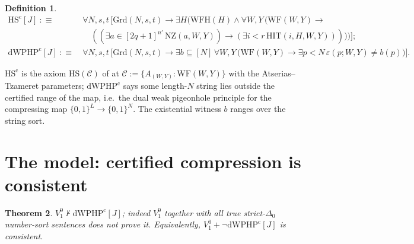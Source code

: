 \documentclass[11pt]{article}
\newtheorem{theorem}{Theorem}
\theoremstyle{definition}
\newtheorem{definition}[theorem]{Definition}
\theoremstyle{remark}
\newcommand{\Vone}{V^0_1}
\newcommand{\WF}{\mathrm{WF}}
\newcommand{\WFH}{\mathrm{WFH}}
\newcommand{\NZ}{\mathrm{NZ}}
\newcommand{\HIT}{\mathrm{HIT}}
\newcommand{\Grd}{\mathrm{Grd}}
\newcommand{\HScert}{\mathrm{HS}^{\mathrm{c}}}
\newcommand{\dWPHPcert}{\mathrm{dWPHP}^{\mathrm{c}}}
\begin{document}
\begin{definition}\label{def:sentences}
\begin{align*}
\HScert[J]\ :\equiv\ &\forall N,s,t\,\Big[\Grd(N,s,t)\to\exists H\big(\WFH(H)\wedge
\forall W,Y\,\big(\WF(W,Y)\to\\
&\quad ((\exists a\in[2q{+}1]^{n'}\,\NZ(a,W,Y))\to(\exists i<r\,\HIT(i,H,W,Y)))\big)\big)\Big];\\
\dWPHPcert[J]\ :\equiv\ &\forall N,s,t\,\Big[\Grd(N,s,t)\to\exists b\subseteq[N]\,
\forall W,Y\,\big(\WF(W,Y)\to\exists p<N\,\varepsilon(p;W,Y)\neq b(p)\big)\Big].
\end{align*}
\end{definition}
$\HScert$ is the axiom $\mathrm{HS}(\mathcal C)$ of
\cite[\S5.1]{AtseriasTzameret2025} at $\mathcal C:=\{A_{(W,Y)}:\WF(W,Y)\}$ with
the Atserias--Tzameret parameters; $\dWPHPcert$ says some length-$N$ string lies
outside the certified range of the map, i.e.\ the dual weak pigeonhole principle
for the compressing map $\{0,1\}^L\to\{0,1\}^N$. The existential witness $b$
ranges over the string sort.

\section{The model: certified compression is consistent}\label{sec:model}

\begin{theorem}\label{thm:dwphp}
$\Vone\nvdash\dWPHPcert[J]$; indeed $\Vone$ together with all true
strict-$\Delta_0$ number-sort sentences does not prove it. Equivalently,
$\Vone+\neg\dWPHPcert[J]$ is consistent.
\end{theorem}
\end{document}
